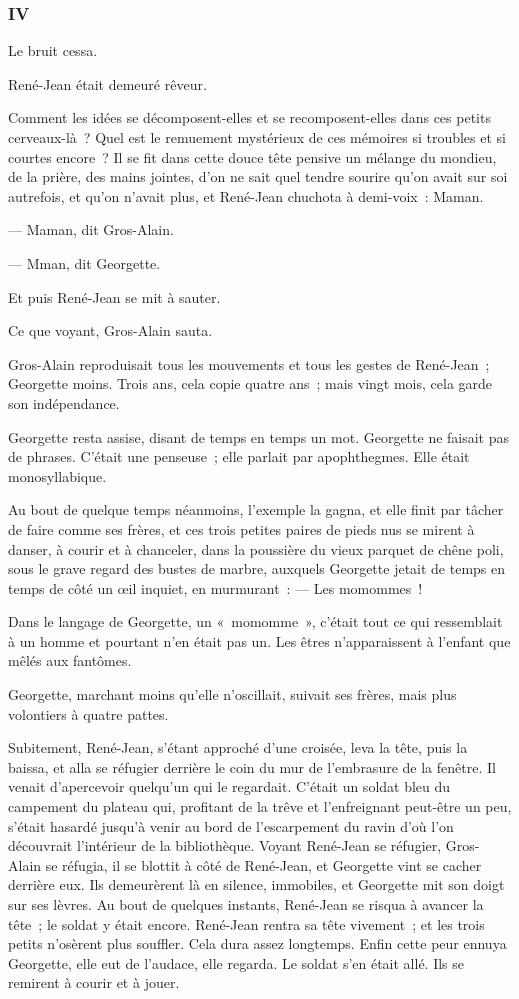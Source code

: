 \documentclass[french,twoside]{book} %
\begin{document}
\subsubsection[{IV}]{IV}
\label{p3l3c4}
\noindent Le bruit cessa.\par
René-Jean était demeuré rêveur.\par
Comment les idées se décomposent-elles et se recomposent-elles dans ces petits cerveaux-là ? Quel est le remuement mystérieux de ces mémoires si troubles et si courtes encore ? Il se fit dans cette douce tête pensive un mélange du mondieu, de la prière, des mains jointes, d’on ne sait quel tendre sourire qu’on avait sur soi autrefois, et qu’on n’avait plus, et René-Jean chuchota à demi-voix : Maman.\par
— Maman, dit Gros-Alain.\par
— Mman, dit Georgette.\par
Et puis René-Jean se mit à sauter.\par
Ce que voyant, Gros-Alain sauta.\par
Gros-Alain reproduisait tous les mouvements et tous les gestes de René-Jean ; Georgette moins. Trois ans, cela copie quatre ans ; mais vingt mois, cela garde son indépendance.\par
Georgette resta assise, disant de temps en temps un mot. Georgette ne faisait pas de phrases. C’était une penseuse ; elle parlait par apophthegmes. Elle était monosyllabique.\par
 Au bout de quelque temps néanmoins, l’exemple la gagna, et elle finit par tâcher de faire comme ses frères, et ces trois petites paires de pieds nus se mirent à danser, à courir et à chanceler, dans la poussière du vieux parquet de chêne poli, sous le grave regard des bustes de marbre, auxquels Georgette jetait de temps en temps de côté un œil inquiet, en murmurant : — Les momommes !\par
Dans le langage de Georgette, un « momomme », c’était tout ce qui ressemblait à un homme et pourtant n’en était pas un. Les êtres n’apparaissent à l’enfant que mêlés aux fantômes.\par
Georgette, marchant moins qu’elle n’oscillait, suivait ses frères, mais plus volontiers à quatre pattes.\par
Subitement, René-Jean, s’étant approché d’une croisée, leva la tête, puis la baissa, et alla se réfugier derrière le coin du mur de l’embrasure de la fenêtre. Il venait d’apercevoir quelqu’un qui le regardait. C’était un soldat bleu du campement du plateau qui, profitant de la trêve et l’enfreignant peut-être un peu, s’était hasardé jusqu’à venir au bord de l’escarpement du ravin d’où l’on découvrait l’intérieur de la bibliothèque. Voyant René-Jean se réfugier, Gros-Alain se réfugia, il se blottit à côté de René-Jean, et Georgette vint se cacher derrière eux. Ils demeurèrent là en silence, immobiles, et Georgette mit son doigt sur ses lèvres. Au bout de quelques instants, René-Jean se risqua à avancer la tête ; le soldat y était encore. René-Jean rentra sa tête vivement ; et les trois petits n’osèrent plus  souffler. Cela dura assez longtemps. Enfin cette peur ennuya Georgette, elle eut de l’audace, elle regarda. Le soldat s’en était allé. Ils se remirent à courir et à jouer.\par
\end{document}
